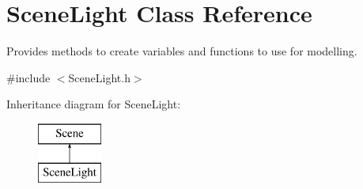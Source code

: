 \hypertarget{class_scene_light}{\section{Scene\+Light Class Reference}
\label{class_scene_light}
}


Provides methods to create variables and functions to use for modelling.  




{\ttfamily \#include $<$Scene\+Light.\+h$>$}

Inheritance diagram for Scene\+Light\+:\begin{figure}[H]
\begin{center}
\leavevmode
\includegraphics[height=2.000000cm]{class_scene_light}
\end{center}
\end{figure}
